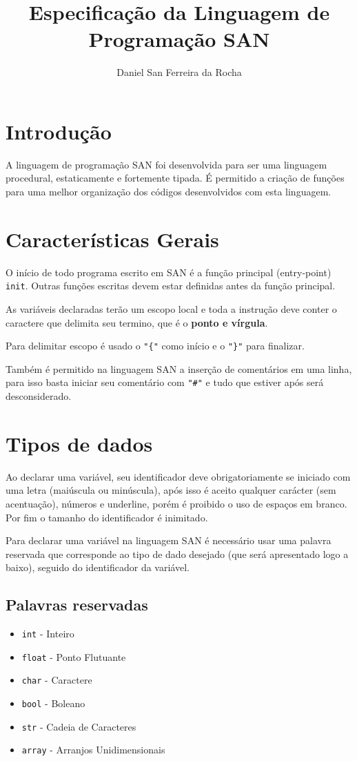 \documentclass[a4paper,11pt]{article}
\title{Especificação da Linguagem de Programação SAN}
\author{Daniel San Ferreira da Rocha}
\begin{document}
\clearpage\maketitle
\thispagestyle{empty}

\pagebreak

\tableofcontents

\pagebreak

\section{Introdução}
A linguagem de programação SAN foi desenvolvida para ser uma linguagem procedural, estaticamente
e fortemente tipada. É permitido a criação de funções para uma melhor organização dos códigos
desenvolvidos com esta linguagem.

\section{Características Gerais}
O início de todo programa escrito em SAN é a função principal (entry-point) \texttt{init}.
Outras funções escritas devem estar definidas antes da função principal.

As variáveis declaradas terão um escopo local e toda a instrução deve conter o caractere que
delimita seu termino, que é o \textbf{ponto e vírgula}.

Para delimitar escopo é usado o \texttt{"\{"} como início e o \texttt{"\}"} para finalizar.

Também é permitido na linguagem SAN a inserção de comentários em uma linha, para isso basta
iniciar seu comentário com \texttt{"\#"} e tudo que estiver após será desconsiderado.

\section{Tipos de dados}
Ao declarar uma variável, seu identificador deve obrigatoriamente se iniciado com uma letra
(maiúscula ou minúscula), após isso é aceito qualquer carácter (sem acentuação), números e
underline, porém é proibido o uso de espaços em branco. Por fim o tamanho do identificador
é inimitado.

Para declarar uma variável na linguagem SAN é necessário usar uma palavra reservada que
corresponde ao tipo de dado desejado (que será apresentado logo a baixo), seguido do
identificador da variável.

\subsection{Palavras reservadas}
\begin{itemize}
    \item \texttt{int} - Inteiro
    \item \texttt{float} - Ponto Flutuante
    \item \texttt{char} - Caractere
    \item \texttt{bool} - Boleano
    \item \texttt{str} - Cadeia de Caracteres
    \item \texttt{array} - Arranjos Unidimensionais
\end{itemize}
\end{document}
